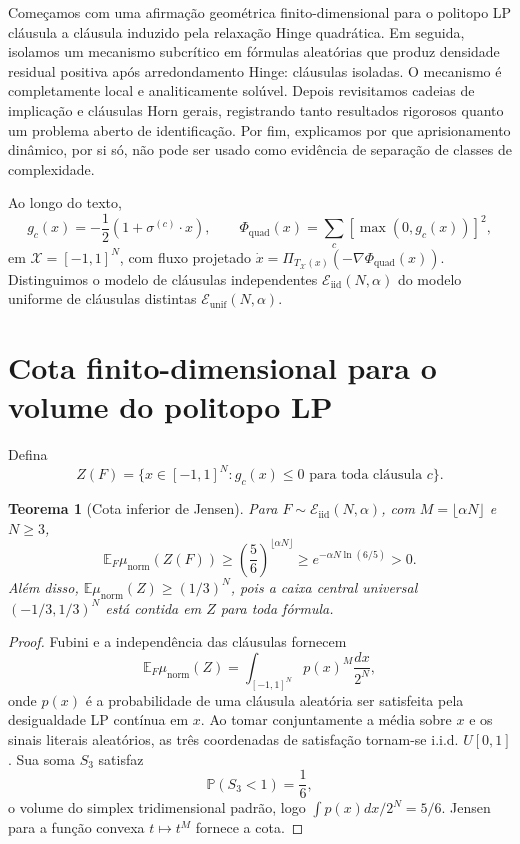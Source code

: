 \documentclass[11pt,a4paper]{article}
\newtheorem{theorem}{Teorema}[section]
\begin{document}
Começamos com uma afirmação geométrica finito-dimensional para o politopo LP cláusula a cláusula induzido pela relaxação Hinge quadrática. Em seguida, isolamos um mecanismo subcrítico em fórmulas aleatórias que produz densidade residual positiva após arredondamento Hinge: cláusulas isoladas. O mecanismo é completamente local e analiticamente solúvel. Depois revisitamos cadeias de implicação e cláusulas Horn gerais, registrando tanto resultados rigorosos quanto um problema aberto de identificação. Por fim, explicamos por que aprisionamento dinâmico, por si só, não pode ser usado como evidência de separação de classes de complexidade.

Ao longo do texto,
\[
g_c(x)=-\frac12(1+\sigma^{(c)}\cdot x),
\qquad
\Phi_{\mathrm{quad}}(x)=\sum_c[\max(0,g_c(x))]^2,
\]
em $\mathcal X=[-1,1]^N$, com fluxo projetado $\dot x=\Pi_{T_{\mathcal X}(x)}(-\nabla\Phi_{\mathrm{quad}}(x))$. Distinguimos o modelo de cláusulas independentes $\mathcal E_{\mathrm{iid}}(N,\alpha)$ do modelo uniforme de cláusulas distintas $\mathcal E_{\mathrm{unif}}(N,\alpha)$.

\section{Cota finito-dimensional para o volume do politopo LP}
Defina
\[
Z(F)=\{x\in[-1,1]^N:g_c(x)\le0\text{ para toda cláusula }c\}.
\]
\begin{theorem}[Cota inferior de Jensen]
Para $F\sim\mathcal E_{\mathrm{iid}}(N,\alpha)$, com $M=\lfloor\alpha N\rfloor$ e $N\ge3$,
\[
\mathbb E_F\mu_{\mathrm{norm}}(Z(F))
\ge\left(\frac56\right)^{\lfloor\alpha N\rfloor}
\ge e^{-\alpha N\ln(6/5)}>0.
\]
Além disso, $\mathbb E\mu_{\mathrm{norm}}(Z)\ge(1/3)^N$, pois a caixa central universal $(-1/3,1/3)^N$ está contida em $Z$ para toda fórmula.
\end{theorem}
\begin{proof}
Fubini e a independência das cláusulas fornecem
\[
\mathbb E_F\mu_{\mathrm{norm}}(Z)
=\int_{[-1,1]^N}p(x)^M\frac{dx}{2^N},
\]
onde $p(x)$ é a probabilidade de uma cláusula aleatória ser satisfeita pela desigualdade LP contínua em $x$. Ao tomar conjuntamente a média sobre $x$ e os sinais literais aleatórios, as três coordenadas de satisfação tornam-se i.i.d. $U[0,1]$. Sua soma $S_3$ satisfaz
\[
\mathbb P(S_3<1)=\frac16,
\]
o volume do simplex tridimensional padrão, logo $\int p(x)dx/2^N=5/6$. Jensen para a função convexa $t\mapsto t^M$ fornece a cota.
\end{proof}
\end{document}
